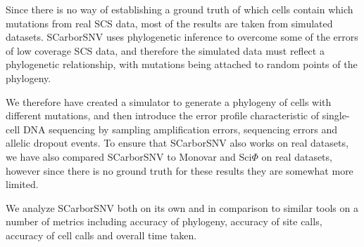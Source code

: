 \documentclass[../../main.tex]{subfiles}
\begin{document}
Since there is no way of establishing a ground truth of which cells contain which mutations from real SCS data, most of the results are taken from simulated datasets.
SCarborSNV uses phylogenetic inference to overcome some of the errors of low coverage SCS data, and therefore the simulated data must reflect a phylogenetic relationship, with mutations being attached to random points of the phylogeny.

We therefore have created a simulator to generate a phylogeny of cells with different mutations, and then introduce the error profile characteristic of single-cell DNA sequencing by sampling amplification errors, sequencing errors and allelic dropout events.
To ensure that SCarborSNV also works on real datasets, we have also compared SCarborSNV to Monovar and Sci$\Phi$ on real datasets, however since there is no ground truth for these results they are somewhat more limited.

We analyze SCarborSNV both on its own and in comparison to similar tools on a number of metrics including accuracy of phylogeny, accuracy of site calls, accuracy of cell calls and overall time taken.

\end{document}
